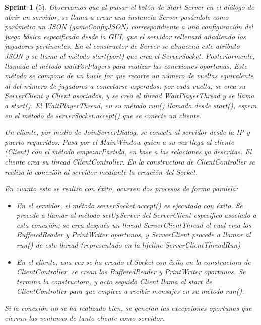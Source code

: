 \documentclass[12pt,a4paper,openright]{book}
\theoremstyle{break}
\newtheorem*{sprint}{Sprint}
\begin{document}
\begin{sprint}[5]
Observamos que al pulsar el botón de Start Server en el diálogo de abrir un servidor, se llama a crear una instancia Server pasándole como parámetro un JSON (gameConfigJSON) correspondiente a una configuración del juego básica especificada desde la GUI, que el servidor rellenará añadiendo los jugadores pertinentes.
En el constructor de Server se almacena este atributo JSON y se llama al método start(port) que crea el ServerSocket. Posteriormente, llamada al método waitForPlayers para realizar las conexiones oportunas.
Este método se compone de un bucle for que recorre un número de vueltas equivalente al del número de jugadores a conectarse esperados. por cada vuelta, se crea su ServerClient y Client asociados, y se crea el thread WaitPlayerThread y se llama a start(). El WaitPlayerThread, en su método run() llamado desde start(), espera en el método de serverSocket.accept() que se conecte un cliente.

Un cliente, por medio de JoinServerDialog, se conecta al servidor desde la IP y puerto requeridos. Pasa por el MainWindow quien a su vez llega al cliente (Client) con el método empezarPartida, en base a las relaciones ya descritas. El cliente crea su thread ClientController. En la constructora de ClientController se realiza la conexión al servidor mediante la creación del Socket.

En cuanto esta se realiza con éxito, ocurren dos procesos de forma paralela:

\begin{itemize}
\item En el servidor, el método serverSocket.accept() es ejecutado con éxito. Se procede a llamar al método setUpServer del ServerClient específico asociado a esta conexión; se crea después un thread ServerClientThread el cual crea los BufferedReader y PrintWriter oportunos, y ServerClient procede a llamar al run() de este thread (representado en la lifeline ServerClientThreadRun)

\item En el cliente, una vez se ha creado el Socket con éxito en la constructora de ClientController, se crean los BufferedReader y PrintWriter oportunos. Se termina la constructora, y acto seguido Client llama al start de ClientController para que empiece a recibir mensajes en su método run().
\end{itemize}

Si la conexión no se ha realizado bien, se generan las excepciones oportunas que cierran las ventanas de tanto cliente como servidor.


\end{sprint}
\end{document}
